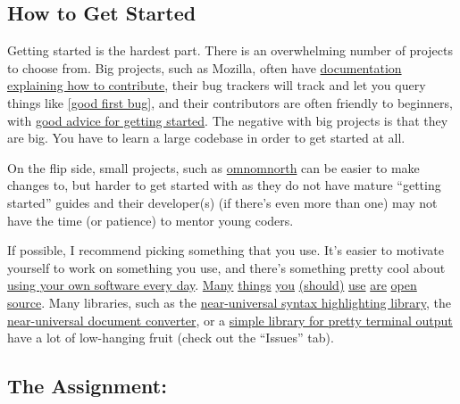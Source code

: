 \documentclass{article}
\begin{document}
\subsection*{How to Get Started}

Getting started is the hardest part. There is an overwhelming number of
projects to choose from.
Big projects, such as Mozilla, often have
\href{https://developer.mozilla.org/en-US/docs/Introduction}
{documentation explaining how to contribute},
their bug trackers will track and let you query things like
\href{https://bugzilla.mozilla.org/buglist.cgi?resolution=---&classification=Client%20Software&emailtype1=regexp&status_whiteboard_type=allwordssubstr&query_format=advanced&emailassigned_to1=1&status_whiteboard=%5Bgood%20first%20bug%5D&email1=nobody}
{[good first bug]},
and their contributors are often friendly to beginners, with
\href{https://bugzilla.mozilla.org/show_bug.cgi?id=361983#c11}
{good advice for getting started}.
The negative with big projects is that they are big. You have to learn a large
codebase in order to get started at all.

On the flip side, small projects, such as
\href{https://github.com/kylelady/omnomnorth}{omnomnorth}
can be easier to make changes to, but harder to get started with as they do
not have mature ``getting started'' guides and their developer(s) (if there's
even more than one) may not have the time (or patience) to mentor young
coders.

If possible, I recommend picking something that you use. It's easier to
motivate yourself to work on something you use, and there's something pretty
cool about \href{https://github.com/um-cseg/chez-betty/}{using your own
software every day}.
\href{https://github.com/Aluxian/Facebook-Messenger-Desktop}{Many}
\href{https://github.com/GNOME/gnome-terminal}{things}
\href{https://github.com/gnachman/iTerm2}{you}
\href{https://github.com/tmux/tmux}{(should)}
\href{https://trac.transmissionbt.com/wiki/Building}{use}
\href{https://github.com/scummvm/scummvm}{are}
\href{https://github.com/GNOME/gimp}{open}
\href{https://github.com/videolan/vlc}{source}.
Many libraries, such as the
\href{https://bitbucket.org/birkenfeld/pygments-main}
{near-universal syntax highlighting library}, the
\href{https://github.com/jgm/pandoc}
{near-universal document converter}, or a
\href{https://github.com/tartley/colorama}
{simple library for pretty terminal output}
have a lot of low-hanging fruit (check out the ``Issues'' tab).

\newpage
\subsection*{The Assignment:}
\end{document}
